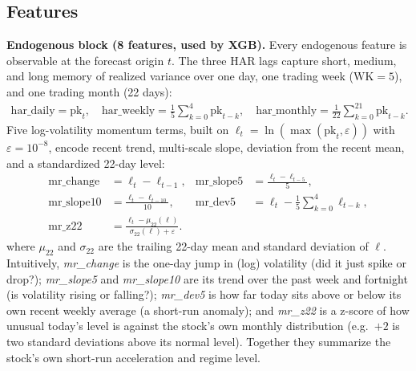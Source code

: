 \documentclass[runningheads]{llncs}
\begin{document}
\subsection*{Features}
\textbf{Endogenous block (8 features, used by XGB).} Every endogenous feature is observable at the
forecast origin $t$. The three HAR lags capture short, medium, and long memory of realized variance
over one day, one trading week ($\mathrm{WK}=5$), and one trading month (22 days):
\begin{align}
\mathrm{har\_daily} = \mathrm{pk}_t, \quad
\mathrm{har\_weekly} = \frac{1}{5}\sum_{k=0}^{4}\mathrm{pk}_{t-k}, \quad
\mathrm{har\_monthly} = \frac{1}{22}\sum_{k=0}^{21}\mathrm{pk}_{t-k}.
\end{align}
Five log-volatility momentum terms, built on $\ell_t=\ln(\max(\mathrm{pk}_t,\varepsilon))$ with
$\varepsilon=10^{-8}$, encode recent trend, multi-scale slope, deviation from the recent mean, and a
standardized 22-day level:
\begin{align}
\mathrm{mr\_change} &= \ell_t-\ell_{t-1}, &
\mathrm{mr\_slope5} &= \frac{\ell_t-\ell_{t-5}}{5},\\
\mathrm{mr\_slope10} &= \frac{\ell_t-\ell_{t-10}}{10}, &
\mathrm{mr\_dev5} &= \ell_t-\frac{1}{5}\sum_{k=0}^{4}\ell_{t-k},\\
\mathrm{mr\_z22} &= \frac{\ell_t-\mu_{22}(\ell)}{\sigma_{22}(\ell)+\varepsilon}. &&
\end{align}
where $\mu_{22}$ and $\sigma_{22}$ are the trailing 22-day mean and standard deviation of $\ell$.
Intuitively, \emph{mr\_change} is the one-day jump in (log) volatility (did it just spike or drop?); \emph{mr\_slope5} and \emph{mr\_slope10} are its trend over the past week and fortnight (is volatility rising or falling?); \emph{mr\_dev5} is how far today sits above or below its own recent weekly average (a short-run anomaly); and \emph{mr\_z22} is a z-score of how unusual today's level is against the stock's own monthly distribution (e.g.\ $+2$ is two standard deviations above its normal level). Together they summarize the stock's own short-run acceleration and regime level.
\end{document}
